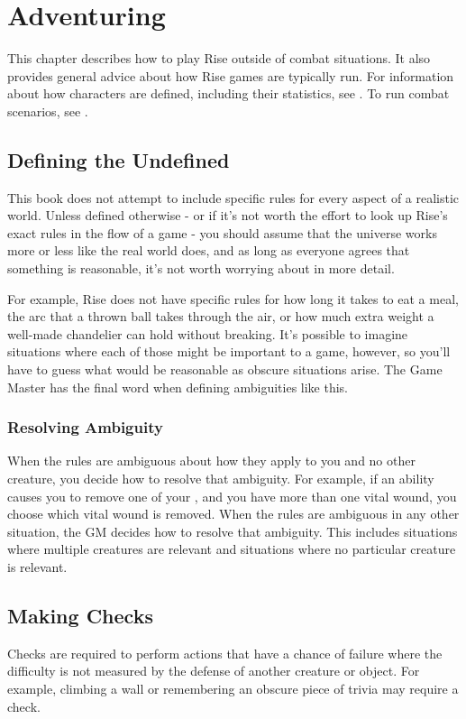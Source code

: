 \chapter{Adventuring}\label{Adventuring}

This chapter describes how to play Rise outside of combat situations.
It also provides general advice about how Rise games are typically run.
For information about how characters are defined, including their statistics, see .
To run combat scenarios, see .

\section{Defining the Undefined}
  This book does not attempt to include specific rules for every aspect of a realistic world.
  Unless defined otherwise - or if it's not worth the effort to look up Rise's exact rules in the flow of a game - you should assume that the universe works more or less like the real world does, and as long as everyone agrees that something is reasonable, it's not worth worrying about in more detail.

  For example, Rise does not have specific rules for how long it takes to eat a meal, the arc that a thrown ball takes through the air, or how much extra weight a well-made chandelier can hold without breaking.
  It's possible to imagine situations where each of those might be important to a game, however, so you'll have to guess what would be reasonable as obscure situations arise.
  The Game Master has the final word when defining ambiguities like this.

  \subsection{Resolving Ambiguity}\label{Resolving Ambiguity}
    When the rules are ambiguous about how they apply to you and no other creature, you decide how to resolve that ambiguity.
    For example, if an ability causes you to remove one of your , and you have more than one vital wound, you choose which vital wound is removed.
    When the rules are ambiguous in any other situation, the GM decides how to resolve that ambiguity.
    This includes situations where multiple creatures are relevant and situations where no particular creature is relevant.

\section{Making Checks}\label{Checks}\label{Making Checks}
  Checks are required to perform actions that have a chance of failure where the difficulty is not measured by the defense of another creature or object.
  For example, climbing a wall or remembering an obscure piece of trivia may require a check.

